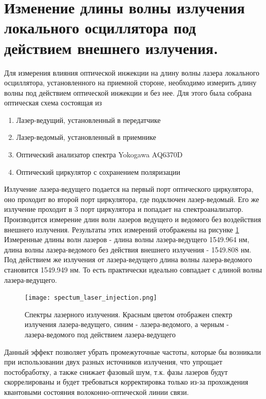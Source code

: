 \section{Изменение длины волны излучения локального осциллятора под действием внешнего излучения.}\label{sec:ch2/sect7}
Для измерения влияния оптической инжекции на длину волны лазера локального осциллятора, установленного на приемной стороне, необходимо измерить длину волны под действием оптической инжекции и без нее. 
Для этого была собрана оптическая схема состоящая из
\begin{enumerate}
    \item Лазер-ведущий, установленный в передатчике
    \item Лазер-ведомый, установленный в приемнике
    \item Оптический анализатор спектра Yokogawa AQ6370D
    \item Оптический циркулятор с сохранением поляризации
\end{enumerate}
Излучение лазера-ведущего подается на первый порт оптического циркулятора, оно проходит во второй порт циркулятора, где подключен лазер-ведомый. Его же излучение проходит в 3 порт циркулятора и попадает на спектроанализатор.
Производится измерение длин волн лазеров ведущего и ведомого без воздействия внешнего излучения. Результаты этих измерений отображены на рисунке \ref*{fig:spectrums_injection}
Измеренные длины волн лазеров - длина волны лазера-ведущего 1549.964 нм, длина волны лазера-ведомого без действия внешнего излучения - 1549.808 нм. Под действием же излучения от лазера-ведущего длина волны лазера-ведомого становится 1549.949 нм. То есть практически идеально совпадает с длиной волны лазера-ведущего.
\begin{figure}
    \centering
    \texttt{[image: spectum\_laser\_injection.png]}
    \caption*{Спектры лазерного излучения. Красным цветом отображен спектр излучения лазера-ведущего, синим - лазера-ведомого, а черным - лазера-ведомого под действием лазера-ведущего}
    \label{fig:spectrums_injection}
\end{figure}
Данный эффект позволяет убрать промежуточные частоты, которые бы возникали при использовании двух разных источников излучения, что упрощает постобработку, а также снижает фазовый шум, т.к. фазы лазеров будут скоррелированы и будет требоваться корректировка только из-за прохождения квантовыми состояния волоконно-оптической линии связи.

